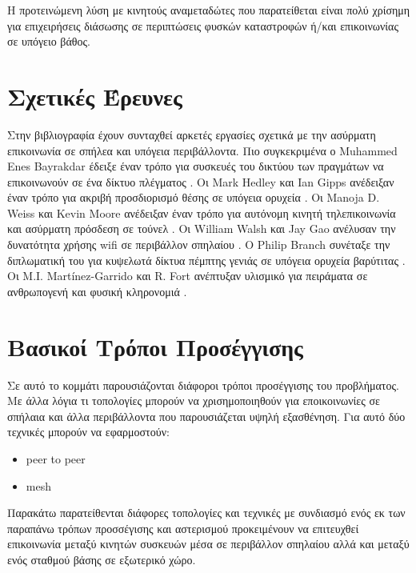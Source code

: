 \documentclass[12pt]{article}
\begin{document}
\begin{multicols*}{2}
    Η προτεινώμενη λύση με κινητούς αναμεταδώτες που παρατείθεται είναι πολύ χρίσημη για επιχειρήσεις διάσωσης σε περιπτώσεις φυσκών καταστροφών ή/και
    επικοινωνίας σε υπόγειο βάθος.

    \section{\normalsize \textsf{Σχετικές Έρευνες}} Στην βιβλιογραφία έχουν συνταχθεί αρκετές εργασίες σχετικά με την ασύρματη επικοινωνία σε σπήλεα και υπόγεια
        περιβάλλοντα. Πιο συγκεκριμένα ο Muhammed Enes Bayrakdar έδειξε έναν τρόπο για συσκευές του δικτύου των πραγμάτων να επικοινωνούν σε ένα δίκτυο
        πλέγματος \cite{bayrakdar_rule_2019}. Οι Mark Hedley και Ian Gipps ανέδειξαν έναν τρόπο για ακριβή προσδιορισμό θέσης σε υπόγεια ορυχεία
        \cite{hedley_accurate_2013}. Οι Manoja D. Weiss και Kevin Moore ανέδειξαν έναν τρόπο για αυτόνομη κινητή τηλεπικοινωνία και ασύρματη πρόσδεση σε τούνελ
        \cite{weiss_autonomous_2009}. Οι William Walsh και Jay Gao ανέλυσαν την δυνατότητα χρήσης wifi σε περιβάλλον σπηλαίου \cite{walsh_communications_2018}.
        Ο Philip Branch συνέταξε την διπλωματική του για κυψελωτά δίκτυα πέμπτης γενιάς σε υπόγεια ορυχεία βαρύτιτας \cite{branch_fifth_2021}. Οι M.I.
        Martínez-Garrido και R. Fort ανέπτυξαν υλισμικό για πειράματα σε ανθρωπογενή και φυσική κληρονομιά \cite{martinez-garrido_experimental_2016}. 

    \section{\normalsize \textsf{Βασικοί Τρόποι Προσέγγισης}} Σε αυτό το κομμάτι παρουσιάζονται διάφοροι τρόποι προσέγγισης του προβλήματος. Με άλλα λόγια τι
        τοπολογίες μπορούν να χρισημοποιηθούν για εποικοινωνίες σε σπήλαια και άλλα περιβάλλοντα που παρουσιάζεται υψηλή εξασθένηση. Για αυτό δύο τεχνικές
        μπορούν να εφαρμοστούν:
    \begin{itemize}
        \item peer to peer
        \item mesh
    \end{itemize}

    Παρακάτω παρατείθενται διάφορες τοπολογίες και τεχνικές με συνδιασμό ενός εκ των παραπάνω τρόπων προσσέγισης και αστερισμού προκειμένουν να επιτευχθεί
    επικοινωνία μεταξύ κινητών συσκευών μέσα σε περιβάλλον σπηλαίου αλλά και μεταξύ ενός σταθμού βάσης σε εξωτερικό χώρο.


\end{multicols*}
\end{document}
